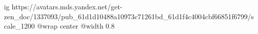  
 
 
 
 

\ifcmt
  ig https://avatars.mds.yandex.net/get-zen_doc/1337093/pub_61d1d10488a10973c71261bd_61d1f4c4004cbf66851f6799/scale_1200
	@wrap center
	@width 0.8
\fi
